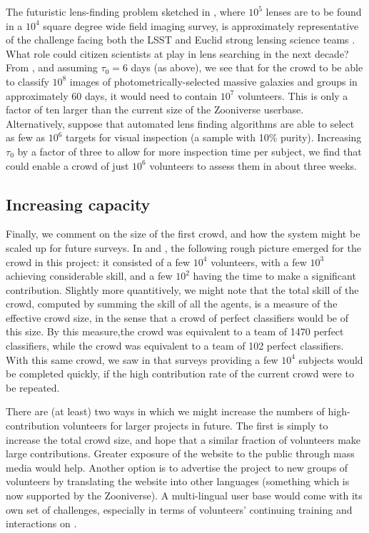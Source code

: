 \documentclass[useAMS,usenatbib,a4paper]{mn2e}
\begin{document}
The futuristic lens-finding problem sketched in , where $10^5$
lenses are to be found in a $10^4$ square degree wide field imaging survey, is
approximately representative of the challenge facing both the LSST and Euclid
strong lensing science teams \citep{LSSTSciBook,EuclidSciBook}. What role could
citizen scientists at \SW play in lens searching in the next decade? From
, and assuming $\tau_0 = 6$ days (as above), we see that for the
\SW crowd to be able to classify $10^8$ images of  photometrically-selected
massive galaxies and groups in approximately 60 days, it would need to contain
$10^7$ volunteers. This is only  a factor of ten larger than the current size of
the Zooniverse userbase. Alternatively, suppose that automated  lens finding
algorithms are able to select as few as $10^6$ targets for visual inspection (a
sample with 10\% purity). Increasing $\tau_0$ by a factor of three to allow for
more inspection time per subject,  we find that \SW could enable a crowd of just
$10^6$ volunteers to assess them in about three  weeks.


\subsection{Increasing capacity}
\label{sec:discuss:capacity}

Finally, we comment on the size of the first \SW crowd, and how the system might
be scaled up for future surveys. In  and
, the following rough picture emerged for the \SW
crowd in this project: it consisted of a few $10^4$ volunteers, with a few
$10^3$ achieving considerable skill, and a few $10^2$ having the time to make a
significant contribution. Slightly more quantitively, we might note that  the
total skill of the crowd, computed by summing the skill of all the agents, is a
measure of the effective crowd size, in the sense that a crowd of perfect
classifiers would be of this size. By this measure,the \StageOne crowd was
equivalent to a team of 1470 perfect classifiers, while the \StageTwo crowd was
equivalent to a team of 102 perfect classifiers. With this same crowd, we saw in
  that surveys providing a few $10^4$ subjects would be
completed quickly, if the high contribution rate of the current crowd were to be
repeated.

There are (at least) two ways in which we might increase the numbers of
high-contribution volunteers for larger projects in future. The first is
simply to increase the total crowd size, and hope that a similar fraction of
volunteers make large contributions. Greater exposure of the website to the
public through mass media would help. Another option is to advertise the
project to new groups of volunteers by translating the website into other
languages (something which is now supported by the Zooniverse). A
multi-lingual user base would come with its own set of challenges, especially
in terms of volunteers' continuing training and interactions on \Talk.
\end{document}
